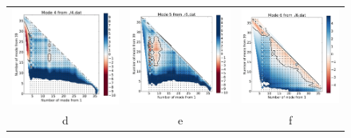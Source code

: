 \begin{figure}[H]
\begin{center}
\begin{tabular}{c c c}
				\includegraphics{image/image/P1-F321} & \includegraphics{image/image/P1-F322} & \includegraphics{image/image/P1-F323} \\
				d & e & f\\

\end{tabular}
\end{center}
\end{figure}
